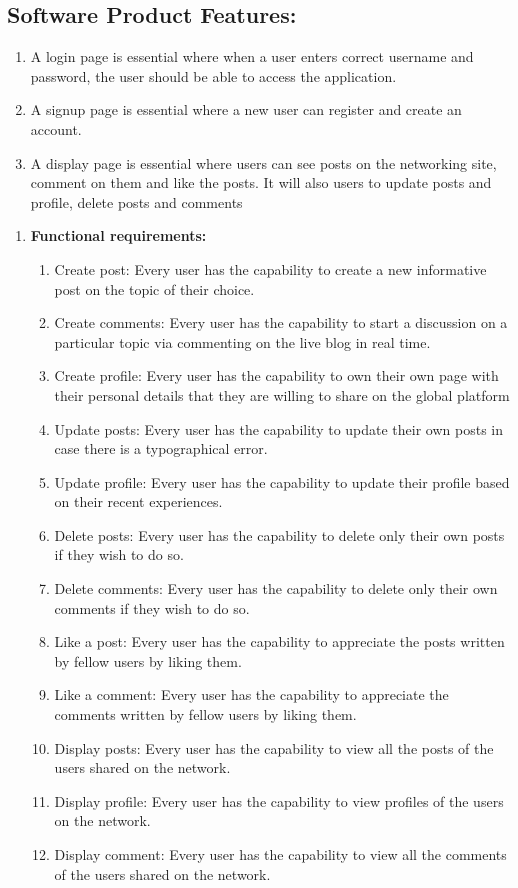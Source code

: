 \documentclass[12pt, letterpaper, twoside]{article}
\begin{document}
		\subsection{Software Product Features:  }
		\begin{enumerate}
\item A login page is essential where when a user enters correct username and
password, the user should be able to access the application.
\item A signup page is essential where a new user can register and create an
account.
\item A display page is essential where users can see posts on the networking site, comment on them and like the posts. It will also users to update posts and profile, delete posts and comments
		\end{enumerate}
		\begin{enumerate}
		\item \textbf{Functional requirements: }
		\begin{enumerate}
			\item Create post: Every user has the capability to create a new informative post on the topic of their choice.
			\item Create comments: Every user has the capability to start a discussion on a particular topic via commenting on the live blog in real time.
			\item Create profile: Every user has the capability to own their own page with their personal details that they are willing to share on the global platform
			\item Update posts: Every user has the capability to update their own posts in case there is a typographical error.
			\item Update profile: Every user has the capability to update their profile based on their recent experiences.
			\item Delete posts: Every user has the capability to delete only their own posts if they wish to do so.
			\item Delete comments: Every user has the capability to delete only their own comments if they wish to do so.
			\item Like a post: Every user has the capability to appreciate the posts written by fellow users by liking them.
			\item Like a comment: Every user has the capability to appreciate the comments written by fellow users by liking them.
			\item Display posts: Every user has the capability to view all the posts of the users shared on the network.
			\item Display profile: Every user has the capability to view profiles of the users on the network.
			\item Display comment: Every user has the capability to view all the comments of the users shared on the network.
		\end{enumerate}
		\end{enumerate}
\end{document}
